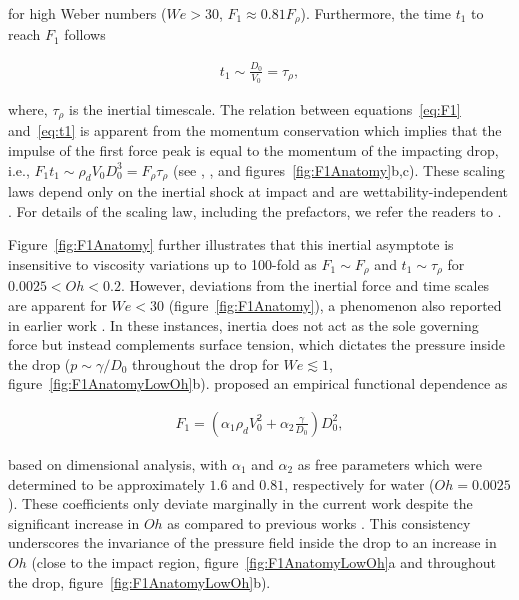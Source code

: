 \documentclass{jfm}
\newcommand{\Wen}{\mathit{We}}
\begin{document}
\noindent for high Weber numbers ($\Wen > 30$, $F_1 \approx 0.81F_\rho$). Furthermore, the time $t_1$ to reach $F_1$ follows 

\begin{align}\label{eq:t1}
	t_1 \sim \frac{D_0}{V_0} = \tau_\rho,
\end{align}

\noindent where, $\tau_\rho$ is the inertial timescale. The relation between equations~\eqref{eq:F1} and~\eqref{eq:t1} is apparent from the momentum conservation which implies that the impulse of the first force peak is equal to the momentum of the impacting drop, i.e., $F_1t_1 \sim \rho_dV_0D_0^3 = F_\rho\tau_\rho$ (see \citealp{Gordillo2018}, \citealp{zhang2022impact}, and figures~\ref{fig:F1Anatomy}b,c). These scaling laws depend only on the inertial shock at impact and are wettability-independent \citep{Zhang2017, Gordillo2018, zhang2022impact}. For details of the scaling law, including the prefactors, we refer the readers to \citet{Philippi2016, Gordillo2018, cheng2021drop}. 

Figure~\ref{fig:F1Anatomy} further illustrates that this inertial asymptote is insensitive to viscosity variations up to 100-fold as $F_1 \sim F_\rho$ and $t_1 \sim \tau_\rho$ for $0.0025 < Oh < 0.2$. However, deviations from the inertial force and time scales are apparent for $\Wen < 30$ (figure~\ref{fig:F1Anatomy}), a phenomenon also reported in earlier work \citep{Soto2014, zhang2022impact}. In these instances, inertia does not act as the sole governing force but instead complements surface tension, which dictates the pressure inside the drop ($p \sim \gamma/D_0$ throughout the drop for $We \lesssim 1$, figure~\ref{fig:F1AnatomyLowOh}b). \citet{zhang2022impact} proposed an empirical functional dependence as

\begin{align}
	F_1 = \left(\alpha_1\rho_d V_0^2 + \alpha_2\frac{\gamma}{D_0}\right)D_0^2,
\end{align}

\noindent based on dimensional analysis, with $\alpha_1$ and $\alpha_2$ as free parameters which were determined to be approximately $1.6$ and $0.81$, respectively for water ($Oh = 0.0025$). These coefficients only deviate marginally in the current work despite the significant increase in $Oh$ as compared to previous works \citep{cheng2021drop, zhang2022impact}. This consistency underscores the invariance of the pressure field inside the drop to an increase in $Oh$ (close to the impact region, figure~\ref{fig:F1AnatomyLowOh}a and throughout the drop, figure~\ref{fig:F1AnatomyLowOh}b).
\end{document}
